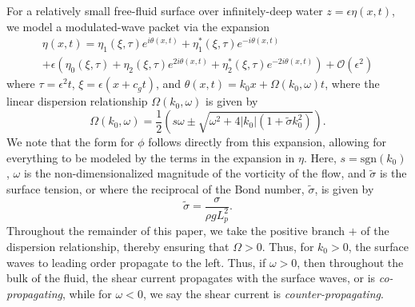 \documentclass[a4paper,11pt]{article}
\begin{document}
For a relatively small free-fluid surface over infinitely-deep water $z=\epsilon \eta(x,t)$, we model a modulated-wave packet via the expansion 
\begin{multline*}
\eta(x,t) = \eta_{1}(\xi,\tau)e^{i\theta(x,t)} + \eta^{\ast}_{1}(\xi,\tau)e^{-i\theta(x,t)}\\
+ \epsilon\left(\eta_{0}(\xi,\tau) + \eta_{2}(\xi,\tau)e^{2i\theta(x,t)} + \eta^{\ast}_{2}(\xi,\tau)e^{-2i\theta(x,t)}\right) + \mathcal{O}\left(\epsilon^{2} \right)
\end{multline*}
where $\tau = \epsilon^{2}t$, $\xi = \epsilon(x+c_{g}t)$, and $\theta(x,t) = k_{0}x + \Omega(k_{0},\omega)t$, where the linear dispersion relationship $\Omega(k_{0},\omega)$ is given by
\[
\Omega(k_{0},\omega) = \frac{1}{2}\left(s\omega \pm \sqrt{\omega^{2} + 4|k_{0}|\left(1+\tilde{\sigma}k_{0}^{2}\right)} \right).
\]
We note that the form for $\phi$ follows directly from this expansion, allowing for everything to be modeled by the terms in the expansion in $\eta$.  Here, $s = \mbox{sgn}(k_{0})$, $\omega$ is the non-dimensionalized magnitude of the vorticity of the flow, and $\tilde{\sigma}$ is the surface tension, or where the reciprocal of the Bond number, $\tilde{\sigma}$, is given by
\[
\tilde{\sigma} = \frac{\sigma}{\rho g L_{p}^2}.
\]
Throughout the remainder of this paper, we take the positive branch $+$ of the dispersion relationship, thereby ensuring that $\Omega > 0$.  Thus, for $k_{0}>0$, the surface waves to leading order propagate to the left.  Thus, if $\omega>0$, then throughout the bulk of the fluid, the shear current propagates with the surface waves, or is {\it co-propagating}, while for $\omega<0$, we say the shear current is {\it counter-propagating}.  
\end{document}
